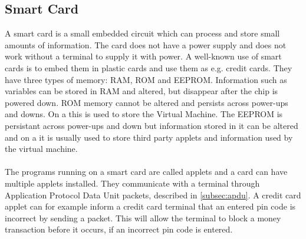 \subsection{Smart Card}
A smart card is a small embedded circuit which can process and store small amounts of information. The card does not have a power supply and does not work without a terminal to supply it with power. A well-known use of smart cards is to embed them in plastic cards and use them as e.g. credit cards. They have three types of memory: RAM, ROM and EEPROM. Information such as variables can be stored in RAM and altered, but disappear after the chip is powered down. ROM memory cannot be altered and persists across power-ups and downs. On a \jc this is used to store the \jc Virtual Machine. The EEPROM is persistant across power-ups and down but information stored in it can be altered and on a \jc it is usually used to store third party applets and information used by the virtual machine.\\\\
The programs running on a \jc smart card are called applets and a card can have multiple applets installed. They communicate with a terminal through Application Protocol Data Unit packets, described in \cref{subsec:apdu}. A credit card applet can for example inform a credit card terminal that an entered pin code is incorrect by sending a packet. This will allow the terminal to block a money transaction before it occurs, if an incorrect pin code is entered.